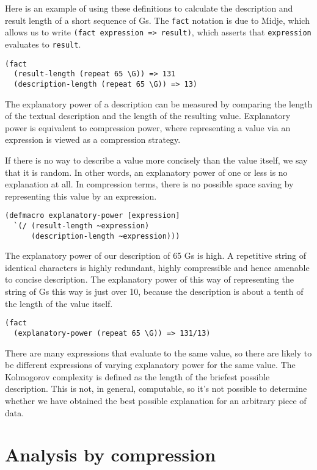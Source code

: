 \documentclass[numbers]{sigplanconf}
\begin{document}
Here is an example of using these definitions to calculate the description and result length of a short sequence of Gs.
The \verb|fact| notation is due to Midje, which allows us to write \verb|(fact expression => result)|,
which asserts that \verb|expression| evaluates to \verb|result|.

\begin{verbatim}
(fact
  (result-length (repeat 65 \G)) => 131
  (description-length (repeat 65 \G)) => 13)
\end{verbatim}

The explanatory power of a description can be measured by comparing the length of the textual description and the length
of the resulting value. Explanatory power is equivalent to compression power, where representing a value via an
expression is viewed as a compression strategy.

If there is no way to describe a value more concisely than the value itself, we say that it is random. In other words, an
explanatory power of one or less is no explanation at all. In compression terms, there is no possible space saving
by representing this value by an expression.

\begin{verbatim}
(defmacro explanatory-power [expression]
  `(/ (result-length ~expression)
      (description-length ~expression)))
\end{verbatim}

The explanatory power of our description of 65 Gs is high. A repetitive string of identical characters is
highly redundant, highly compressible and hence amenable to concise description. The explanatory power of this way of
representing the string of Gs this way is just over 10, because the description is about a tenth of the length of the
value itself.

\begin{verbatim}
(fact
  (explanatory-power (repeat 65 \G)) => 131/13)
\end{verbatim}

There are many expressions that evaluate to the same value, so there are likely to be different expressions of varying
explanatory power for the same value. The Kolmogorov complexity is defined as the length of the briefest possible description.
This is not, in general, computable, so it's not possible to determine whether we have obtained the best possible explanation
for an arbitrary piece of data.

\section{Analysis by compression}
\end{document}
